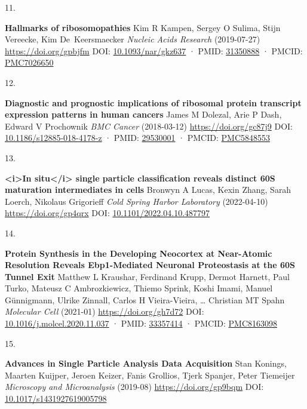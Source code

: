 \documentclass[
]{article}
\newlength{\cslhangindent}
\newlength{\csllabelwidth}
\newlength{\cslentryspacingunit} %
\newenvironment{CSLReferences}[2] %
 {%
  \setlength{\parindent}{0pt}
  \ifodd #1
  \let\oldpar\par
  \def\par{\hangindent=\cslhangindent\oldpar}
  \fi
  \setlength{\parskip}{#2\cslentryspacingunit}
 }%
 {}
\newcommand{\CSLBlock}[1]{#1\hfill\break}
\newcommand{\CSLLeftMargin}[1]{\parbox[t]{\csllabelwidth}{#1}}
\newcommand{\CSLRightInline}[1]{\parbox[t]{\linewidth - \csllabelwidth}{#1}\break}
\begin{document}
\begin{CSLReferences}{0}{0}
\leavevmode{}%
\CSLLeftMargin{11. }%
\CSLRightInline{\textbf{Hallmarks of ribosomopathies}
\CSLBlock{Kim R Kampen, Sergey O Sulima, Stijn Vereecke, Kim De~Keersmaecker} \emph{Nucleic Acids Research} (2019-07-27) \url{https://doi.org/gpbjfm}
\CSLBlock{DOI: \href{https://doi.org/10.1093/nar/gkz637}{10.1093/nar/gkz637} · PMID: \href{https://www.ncbi.nlm.nih.gov/pubmed/31350888}{31350888} · PMCID: \href{https://www.ncbi.nlm.nih.gov/pmc/articles/PMC7026650}{PMC7026650}}}

\leavevmode{}%
\CSLLeftMargin{12. }%
\CSLRightInline{\textbf{Diagnostic and prognostic implications of ribosomal protein transcript expression patterns in human cancers}
\CSLBlock{James M Dolezal, Arie P Dash, Edward V Prochownik} \emph{BMC Cancer} (2018-03-12) \url{https://doi.org/gc87j9}
\CSLBlock{DOI: \href{https://doi.org/10.1186/s12885-018-4178-z}{10.1186/s12885-018-4178-z} · PMID: \href{https://www.ncbi.nlm.nih.gov/pubmed/29530001}{29530001} · PMCID: \href{https://www.ncbi.nlm.nih.gov/pmc/articles/PMC5848553}{PMC5848553}}}

\leavevmode{}%
\CSLLeftMargin{13. }%
\CSLRightInline{\textbf{\textless i\textgreater In situ\textless/i\textgreater{} single particle classification reveals distinct 60S maturation intermediates in cells}
\CSLBlock{Bronwyn A Lucas, Kexin Zhang, Sarah Loerch, Nikolaus Grigorieff} \emph{Cold Spring Harbor Laboratory} (2022-04-10) \url{https://doi.org/gp4qrx}
\CSLBlock{DOI: \href{https://doi.org/10.1101/2022.04.10.487797}{10.1101/2022.04.10.487797}}}

\leavevmode{}%
\CSLLeftMargin{14. }%
\CSLRightInline{\textbf{Protein Synthesis in the Developing Neocortex at Near-Atomic Resolution Reveals Ebp1-Mediated Neuronal Proteostasis at the 60S Tunnel Exit}
\CSLBlock{Matthew L Kraushar, Ferdinand Krupp, Dermot Harnett, Paul Turko, Mateusz C Ambrozkiewicz, Thiemo Sprink, Koshi Imami, Manuel Günnigmann, Ulrike Zinnall, Carlos H Vieira-Vieira, \ldots{} Christian MT Spahn} \emph{Molecular Cell} (2021-01) \url{https://doi.org/gh7d72}
\CSLBlock{DOI: \href{https://doi.org/10.1016/j.molcel.2020.11.037}{10.1016/j.molcel.2020.11.037} · PMID: \href{https://www.ncbi.nlm.nih.gov/pubmed/33357414}{33357414} · PMCID: \href{https://www.ncbi.nlm.nih.gov/pmc/articles/PMC8163098}{PMC8163098}}}

\leavevmode{}%
\CSLLeftMargin{15. }%
\CSLRightInline{\textbf{Advances in Single Particle Analysis Data Acquisition}
\CSLBlock{Stan Konings, Maarten Kuijper, Jeroen Keizer, Fanis Grollios, Tjerk Spanjer, Peter Tiemeijer} \emph{Microscopy and Microanalysis} (2019-08) \url{https://doi.org/gp9bqm}
\CSLBlock{DOI: \href{https://doi.org/10.1017/s1431927619005798}{10.1017/s1431927619005798}}}


\end{CSLReferences}
\end{document}
